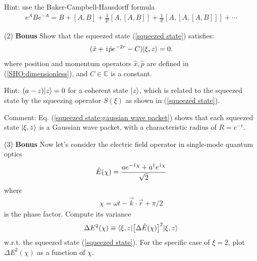 Hint: use the Baker-Campbell-Hausdorff formula
\begin{align}
e^{A}Be^{-A}=B+[A,B]+\frac{1}{2!}[A,[A,B]]+\frac{1}{3!}[A,[A,[A,B]]]+\cdots
\end{align}

(2) \textbf{Bonus} Show that the squeezed state (\ref{squeezed state}) satisfies:
\begin{align}\label{squeezed state:gaussian wave packet}
(\hat x+\hspace{1pt}\mathrm{i}\hspace{1pt}\hat pe^{-2r}-C)|{\xi,z}\rangle=0.
\end{align}
where position and momentum operators $\hat x,\hat p$ are defined in (\ref{SHO:dimensionless}), and $C\in\mathbb{C}$ is a constant. 

Hint: $(a-z)|{z}\rangle=0$ for a coherent state $|{z}\rangle$, which is related to the squeezed state by the squeezing operator $S(\xi)$ as shown in (\ref{squeezed state}). 

Comment: Eq. (\ref{squeezed state:gaussian wave packet}) shows that each squeezed state $|{\xi,z}\rangle$ is a Gaussian wave packet, with a characteristic radius of $R=e^{-r}$. 

(3) \textbf{ Bonus} Now let's consider the electric field operator in single-mode quantum optics
\begin{align}
\hat E(\chi)=\frac{a e^{-\hspace{1pt}\mathrm{i}\hspace{1pt}\chi}+a^\dagger e^{\hspace{1pt}\mathrm{i}\hspace{1pt}\chi}}{\sqrt2}
\end{align}
where 
\begin{align}
\chi=\omega t-{\vec k}\cdot\vec r+\pi/2
\end{align}
is the phase factor. Compute its variance 
\begin{align}
\Delta E^2(\chi)\equiv\langle{\xi,z|\big[\Delta\hat E(\chi)\big]^2|\xi,z}\rangle
\end{align}
w.r.t. the squeezed state (\ref{squeezed state}). For the specific case of $\xi=2$, plot $\Delta E^2(\chi)$ as a function of $\chi$. 

